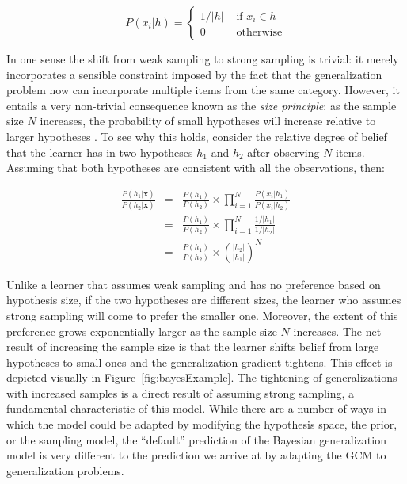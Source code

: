 \documentclass[doc,apacite]{apa6}
\begin{document}
\begin{equation}
\label{strongSampling}
P(x_i | h) = \left\{ \begin{array}{lr} 1/|h| & \mbox{ if } x_i \in h \\ 0 & \mbox{ otherwise} \end{array} \right.
\end{equation}

In one sense the shift from weak sampling to strong sampling is trivial: it merely incorporates a sensible constraint imposed by the fact that the generalization problem now can incorporate multiple items from the same category. However, it entails a very non-trivial consequence known as the {\it size principle}: as the sample size $N$ increases, the probability of small hypotheses will increase relative to larger hypotheses
\cite{tenenbaum1999bayesian}. To see why this holds, consider the relative degree of belief that the learner has in two hypotheses $h_1$ and $h_2$ after observing $N$ items. Assuming that both hypotheses are consistent with all the observations, then:

\begin{eqnarray}
\label{tg4}
\frac{P(h_1 | \bm{x})}{P(h_2 | \bm{x})}
&=& \frac{P(h_1)}{P(h_2)} \times \prod_{i=1}^{N} \frac{P(x_i | h_1)}{P(x_i | h_2)} \nonumber \\
&=& \frac{P(h_1)}{P(h_2)} \times \prod_{i=1}^{N} \frac{1/|h_1|}{1/|h_2|} \nonumber \\
&=& \frac{P(h_1)}{P(h_2)} \times  \left( \frac{|h_2|}{|h_1|} \right)^N
\end{eqnarray}

\noindent
Unlike a learner that assumes weak sampling and has no preference based on hypothesis size, if the two hypotheses are different sizes, the learner who assumes strong sampling will come to prefer the smaller one. Moreover, the extent of this preference grows exponentially larger as the sample size $N$ increases. The net result of increasing the sample size is that the learner shifts belief from large hypotheses to small ones and the generalization gradient tightens. This effect is depicted visually in Figure~\ref{fig:bayesExample}. The tightening of generalizations with increased samples is a direct result of assuming strong sampling, a fundamental characteristic of this model.
While there are a number of ways in which the model could be adapted by modifying the hypothesis space, the prior, or the sampling model, the ``default'' prediction of the Bayesian generalization model is very different to the prediction we arrive at by adapting the GCM to generalization problems.
\end{document}
